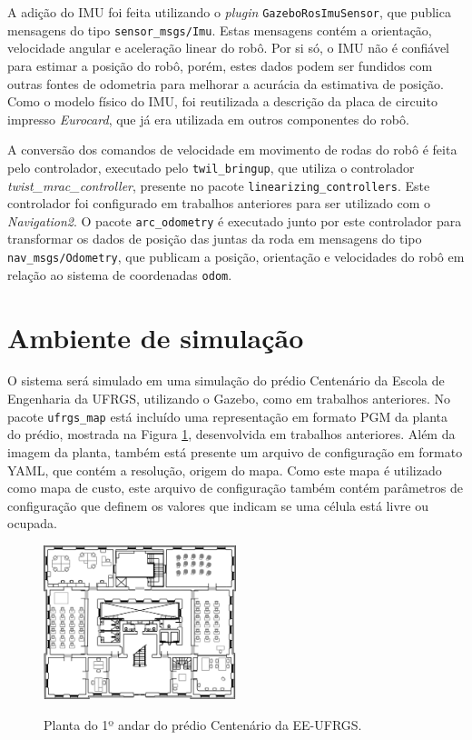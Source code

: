 \documentclass[repeatfields,xlists,xpacks,oneside,yearsonly]{ufrgscca}
\begin{document}
A adição do IMU foi feita utilizando o \textit{plugin}
\texttt{GazeboRosImuSensor}, que publica mensagens do tipo
\texttt{sensor\_msgs/Imu}.
Estas mensagens contém a orientação, velocidade angular e aceleração linear do robô.
Por si só, o IMU não é confiável para estimar a posição do robô, porém, estes
dados podem ser fundidos com outras fontes de odometria para melhorar a
acurácia da estimativa de posição.
Como o modelo físico do IMU, foi reutilizada
a descrição da placa de circuito impresso \textit{Eurocard},
que já era utilizada em outros componentes do robô.

A conversão dos comandos de velocidade em movimento de rodas do
robô é feita pelo controlador, executado pelo \texttt{twil\_bringup},
que utiliza o controlador \textit{twist\_mrac\_controller},
presente no pacote \texttt{linearizing\_controllers}.
Este controlador foi configurado em trabalhos anteriores para
ser utilizado com o \textit{Navigation2}.
O pacote \texttt{arc\_odometry} é executado junto por este
controlador para transformar os dados de posição das juntas
da roda em mensagens do tipo \texttt{nav\_msgs/Odometry},
que publicam a posição, orientação e velocidades do robô em relação
ao sistema de coordenadas \texttt{odom}.

\section{Ambiente de simulação}

O sistema será simulado em uma simulação do prédio Centenário da Escola de Engenharia
da UFRGS, utilizando o Gazebo, como em trabalhos anteriores.
No pacote \texttt{ufrgs\_map} está incluído uma representação em formato PGM da
planta do prédio, mostrada na Figura \ref{fig:planta_centenario}, desenvolvida em
trabalhos anteriores.
Além da imagem da planta, também está presente um arquivo de configuração
em formato YAML, que contém a resolução, origem do mapa.
Como este mapa é utilizado como mapa de custo, este arquivo de configuração
também contém parâmetros de configuração
que definem os valores que indicam se uma célula está livre ou ocupada.

\begin{figure}[h]
    {
        \centering
        \caption{Planta do 1º andar do prédio Centenário da EE-UFRGS.}
        \label{fig:planta_centenario}
        \includegraphics[width=0.5\textwidth]{centenario_floor_plan.png}\\
    }
    {}
\end{figure}
\end{document}

